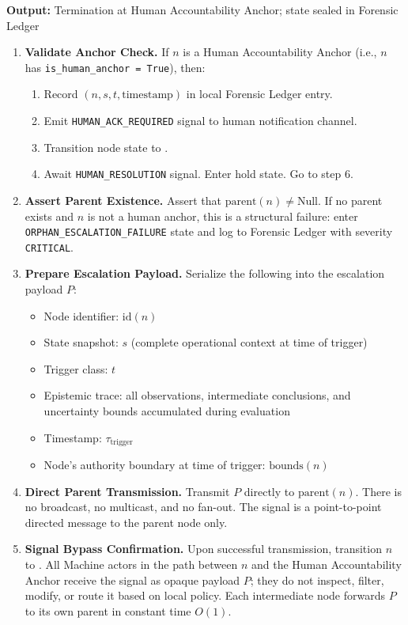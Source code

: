 \medskip
\noindent\textbf{Output:} Termination at Human Accountability Anchor; state sealed in Forensic Ledger

\begin{enumerate}
  \item \textbf{Validate Anchor Check.} If $n$ is a Human Accountability Anchor (i.e., $n$ has \texttt{is\_human\_anchor = True}), then:
  \begin{enumerate}
    \item Record $(n, s, t, \text{timestamp})$ in local Forensic Ledger entry.
    \item Emit \texttt{HUMAN\_ACK\_REQUIRED} signal to human notification channel.
    \item Transition node state to .
    \item Await \texttt{HUMAN\_RESOLUTION} signal. Enter hold state. Go to step 6.
  \end{enumerate}
  \item \textbf{Assert Parent Existence.} Assert that $\text{parent}(n) \neq \text{Null}$. If no parent exists and $n$ is not a human anchor, this is a structural failure: enter \texttt{ORPHAN\_ESCALATION\_FAILURE} state and log to Forensic Ledger with severity \texttt{CRITICAL}.
  \item \textbf{Prepare Escalation Payload.} Serialize the following into the escalation payload $P$:
  \begin{itemize}
    \item Node identifier: $\text{id}(n)$
    \item State snapshot: $s$ (complete operational context at time of trigger)
    \item Trigger class: $t$
    \item Epistemic trace: all observations, intermediate conclusions, and uncertainty bounds accumulated during evaluation
    \item Timestamp: $\tau_{\text{trigger}}$
    \item Node's authority boundary at time of trigger: $\text{bounds}(n)$
  \end{itemize}
  \item \textbf{Direct Parent Transmission.} Transmit $P$ directly to $\text{parent}(n)$. There is no broadcast, no multicast, and no fan-out. The signal is a point-to-point directed message to the parent node only.
  \item \textbf{Signal Bypass Confirmation.} Upon successful transmission, transition $n$ to . All Machine actors in the path between $n$ and the Human Accountability Anchor receive the signal as opaque payload $P$; they do not inspect, filter, modify, or route it based on local policy. Each intermediate node forwards $P$ to its own parent in constant time $O(1)$.

\end{enumerate}
